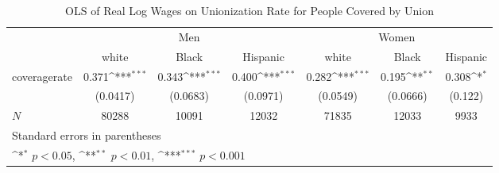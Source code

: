 \begin{table}[htbp]\centering
\def\sym#1{\ifmmode^{#1}\else\(^{#1}\)\fi}
\caption{OLS of Real Log Wages on Unionization Rate for People Covered by Union}
\begin{tabular}{l*{6}{c}}
\hline\hline
            &\multicolumn{3}{c}{Men}                                          &\multicolumn{3}{c}{Women}                                        \\\cmidrule(lr){2-4}\cmidrule(lr){5-7}
            &\multicolumn{1}{c}{white}&\multicolumn{1}{c}{Black}&\multicolumn{1}{c}{Hispanic}&\multicolumn{1}{c}{white}&\multicolumn{1}{c}{Black}&\multicolumn{1}{c}{Hispanic}\\
\hline
coveragerate&       0.371\sym{***}&       0.343\sym{***}&       0.400\sym{***}&       0.282\sym{***}&       0.195\sym{**} &       0.308\sym{*}  \\
            &    (0.0417)         &    (0.0683)         &    (0.0971)         &    (0.0549)         &    (0.0666)         &     (0.122)         \\
\hline
\(N\)       &       80288         &       10091         &       12032         &       71835         &       12033         &        9933         \\
\hline\hline
\multicolumn{7}{l}{\footnotesize Standard errors in parentheses}\\
\multicolumn{7}{l}{\footnotesize \sym{*} \(p<0.05\), \sym{**} \(p<0.01\), \sym{***} \(p<0.001\)}\\
\end{tabular}
\end{table}
